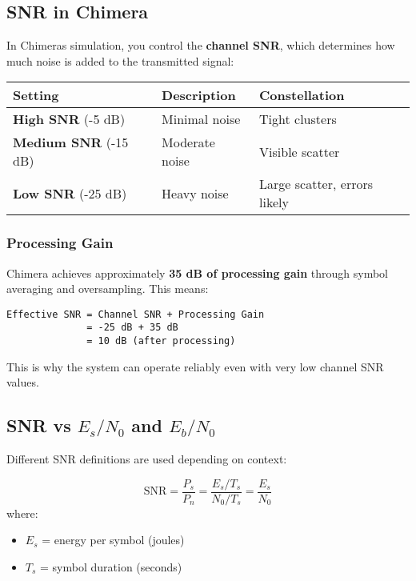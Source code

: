 \subsection{SNR in Chimera}\label{snr-in-chimera}

In Chimera\textquotesingle s simulation, you control the \textbf{channel SNR}, which determines how much noise is added to the transmitted signal:

{\def\LTcaptype{} %
\begin{longtable}[]{@{}lll@{}}
\toprule\noalign{}
Setting & Description & Constellation \\
\midrule\noalign{}
\endhead
\bottomrule\noalign{}
\endlastfoot
\textbf{High SNR} (-5 dB) & Minimal noise & Tight clusters \\
\textbf{Medium SNR} (-15 dB) & Moderate noise & Visible scatter \\
\textbf{Low SNR} (-25 dB) & Heavy noise & Large scatter, errors likely \\
\end{longtable}
}

\subsubsection{Processing Gain}\label{processing-gain}

Chimera achieves approximately \textbf{35 dB of processing gain} through
symbol averaging and oversampling. This means:

\begin{verbatim}
Effective SNR = Channel SNR + Processing Gain
              = -25 dB + 35 dB
              = 10 dB (after processing)
\end{verbatim}

This is why the system can operate reliably even with very low channel
SNR values.

\subsection{SNR vs $E_s/N_0$ and $E_b/N_0$}

Different SNR definitions are used depending on context:

\begin{equation}
\mathrm{SNR} = \frac{P_s}{P_n} = \frac{E_s / T_s}{N_0 / T_s} = \frac{E_s}{N_0}
\end{equation}
where:
\begin{itemize}
\item $E_s$ = energy per symbol (joules)
\item $T_s$ = symbol duration (seconds)
\end{itemize}

